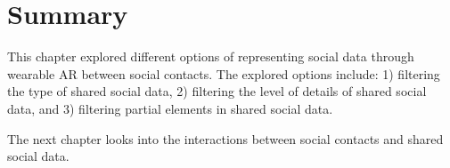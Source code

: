 \section{Summary}

This chapter explored different options of representing social data through wearable AR between social contacts. The explored options include: 1) filtering the type of shared social data, 2) filtering the level of details of shared social data, and 3) filtering partial elements in shared social data. 

The next chapter looks into the interactions between social contacts and shared social data. 